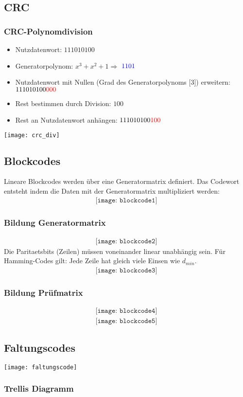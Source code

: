 \subsection{CRC}
\subsubsection{CRC-Polynomdivision}
\begin{itemize}
	\item Nutzdatenwort: $111010100$
	\item Generatorpolynom: $x^3 + x^2 + 1 \Rightarrow$ $\textcolor{blue}{1101}$
	\item Nutzdatenwort mit Nullen (Grad des Generatorpolynoms [3]) erweitern: $111010100\textcolor{red}{000}$
	\item Rest bestimmen durch Division: $100$
	\item Rest an Nutzdatenwort anhängen: $111010100\textcolor{red}{100}$
\end{itemize}
\texttt{[image: crc\_div]}
\subsection{Blockcodes}
Lineare Blockcodes werden über eine Generatormatrix
definiert. Das Codewort entsteht indem die Daten mit der
Generatormatrix multipliziert werden:\\
\begin{align*}
    \texttt{[image: blockcode1]}
\end{align*}
\subsubsection{Bildung Generatormatrix}
\begin{align*}
    \texttt{[image: blockcode2]}
\end{align*}
Die Paritaetsbits (Zeilen) müssen voneinander linear unabhängig sein.
Für Hamming-Codes gilt: Jede Zeile hat gleich viele Einsen wie $d_{min}$.
\begin{align*}
    \texttt{[image: blockcode3]}
\end{align*}
\subsubsection{Bildung Prüfmatrix}
\begin{align*}
    \texttt{[image: blockcode4]}
\end{align*}
\begin{align*}
    \texttt{[image: blockcode5]}
\end{align*}

\subsection{Faltungscodes}
\texttt{[image: faltungscode]}
\subsubsection{Trellis Diagramm}
